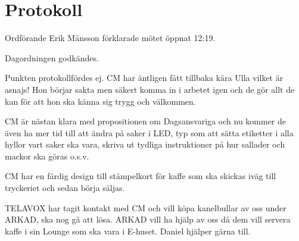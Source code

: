 \documentclass[10pt]{article}
\def\mo{Erik Månsson}
\begin{document}
\section*{Protokoll}
\begin{paragrafer}
Ordförande {\mo} förklarade mötet öppnat 12:19.

{\valavmo}

{\valavms}

{\valavj}

{\tosg}

{\ingaadj}


Dagordningen godkändes.

\ingaprot

\begin{fyllnadsval} %
\end{fyllnadsval}

\begin{paragrafer}
Punkten protokollfördes ej.
CM har äntligen fått tillbaka kära Ulla vilket är asnajs! Hon börjar sakta men säkert komma in i arbetet igen och de gör allt de kan för att hon ska känna sig trygg och välkommen.

CM är nästan klara med propositionen om Dagsansvariga och nu kommer de även ha mer tid till att ändra på saker i LED, typ som att sätta etiketter i alla hyllor vart saker ska vara, skriva ut tydliga instruktioner på hur sallader och mackor ska göras o.s.v.

CM har en färdig design till stämpelkort för kaffe som ska skickas iväg till tryckeriet och sedan börja säljas.

TELAVOX har tagit kontakt med CM och vill köpa kanelbullar av oss under ARKAD, ska nog gå att lösa. ARKAD vill ha hjälp av oss då dem vill servera kaffe i sin Lounge som ska vara i E-huset. Daniel hjälper gärna till.


\end{paragrafer}
\end{paragrafer}
\end{document}
